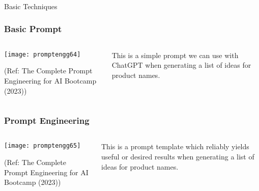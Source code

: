 \begin{frame}[fragile]\frametitle{}
\begin{center}
{\Large Basic Techniques}
\end{center}
\end{frame}


\begin{frame}[fragile]\frametitle{Basic Prompt}

\begin{columns}
    \begin{column}[T]{0.6\linewidth}
		\begin{center}
		\texttt{[image: promptengg64]}

		{\tiny (Ref: The Complete Prompt Engineering for AI Bootcamp (2023))}
		\end{center}	
    \end{column}
    \begin{column}[T]{0.4\linewidth}
		This is a simple prompt we can use with ChatGPT when generating a list of ideas
for product names.
    \end{column}
  \end{columns}
\end{frame}



\begin{frame}[fragile]\frametitle{Prompt Engineering}

\begin{columns}
    \begin{column}[T]{0.6\linewidth}
		\begin{center}
		\texttt{[image: promptengg65]}

		{\tiny (Ref: The Complete Prompt Engineering for AI Bootcamp (2023))}
		\end{center}	
    \end{column}
    \begin{column}[T]{0.4\linewidth}
		This is a prompt template which reliably yields useful or desired results when
generating a list of ideas for product names.
    \end{column}
  \end{columns}
\end{frame}

